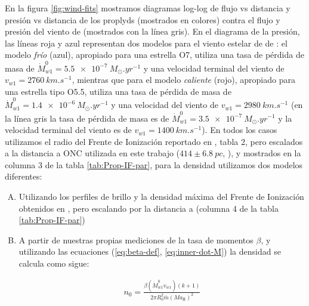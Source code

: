 En la figura \ref{fig:wind-fits} mostramos diagramas log-log de flujo vs distancia y presión vs distancia de los proplyds (mostrados en colores) contra el flujo y presión del viento de \thC{} (mostrados con la línea gris). En el diagrama de la presión, las líneas roja y azul representan dos modelos para el viento estelar de \thc{} de \citet{Gagne:2005}: el modelo \textit{frío} (azul), apropiado para una estrella O7, utiliza una tasa de pérdida de masa de $\dot{M}^0_{w1} = \SI{5.5e-7}{M_\odot.yr^{-1}}$ y una velocidad terminal del viento de $v_{w1} = \SI{2760}{km.s^{-1}}$, mientras que para el modelo \textit{caliente} (rojo), apropiado para una estrella tipo O5.5, utiliza una tasa de pérdida de masa de $\dot{M}^0_{w1} = \SI{1.4e-6}{M_\odot.yr^{-1}}$ y una velocidad del viento de $v_{w1} = \SI{2980}{km.s^{-1}}$ (en la línea gris la tasa de pérdida de masa es de $\dot{M}^0_{w1} = \SI{3.5e-7}{M_\odot.yr^{-1}}$ y la velocidad terminal del viento es de $v_{w1} = \SI{1400}{km.s^{-1}}$). En todos los casos utilizamos el radio del Frente de Ionización reportado en \citet{HA:1998}, tabla 2, pero escalados a la distancia a ONC utilizada en este trabajo ($414 \pm \SI{6.8}{pc}$, \citet{Menten:2007}), y mostrados en la columna 3 de la tabla \ref{tab:Prop-IF-par}, para la densidad utilizamos dos modelos diferentes:

\begin{enumerate}[A.]
\item Utilizando los perfiles de brillo y la densidad máxima del Frente de Ionización obtenidos en \citet{HA:1998}, pero escalando por la distancia a \thC{} (columna 4 de la tabla \ref{tab:Prop-IF-par})
\item A partir de nuestras propias mediciones de la tasa de momentos $\beta$, y utilizando las ecuaciones (\ref{eq:beta-def}, \ref{eq:inner-dot-M}) la densidad se calcula como sigue:

  \begin{align}
    n_0 = \frac{\beta\left(\dot{M}^0_{w1}v_{w1}\right)\left(k + 1\right)}{2\pi R^2_0 \bar{m}\left(M a_{\mathrm{II}}\right)^2} \label{eq:b-density}
  \end{align}
  
\end{enumerate}


